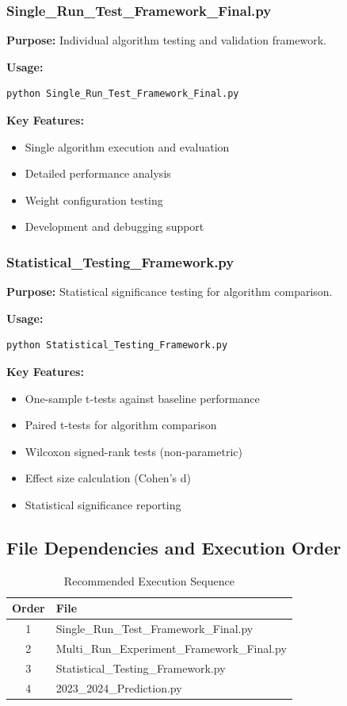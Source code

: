 \subsubsection{Single\_Run\_Test\_Framework\_Final.py}
\textbf{Purpose:} Individual algorithm testing and validation framework.

\textbf{Usage:}
\begin{verbatim}
python Single_Run_Test_Framework_Final.py
\end{verbatim}

\textbf{Key Features:}
\begin{itemize}
\item Single algorithm execution and evaluation
\item Detailed performance analysis
\item Weight configuration testing
\item Development and debugging support
\end{itemize}

\subsubsection{Statistical\_Testing\_Framework.py}
\textbf{Purpose:} Statistical significance testing for algorithm comparison.

\textbf{Usage:}
\begin{verbatim}
python Statistical_Testing_Framework.py
\end{verbatim}

\textbf{Key Features:}
\begin{itemize}
\item One-sample t-tests against baseline performance
\item Paired t-tests for algorithm comparison
\item Wilcoxon signed-rank tests (non-parametric)
\item Effect size calculation (Cohen's d)
\item Statistical significance reporting
\end{itemize}

\subsection{File Dependencies and Execution Order}

\begin{table}[h]
\centering
\caption{Recommended Execution Sequence}
\label{tab:execution_sequence}
\begin{tabular}{cl}
\toprule
\textbf{Order} & \textbf{File} \\
\midrule
1 & Single\_Run\_Test\_Framework\_Final.py \\
2 & Multi\_Run\_Experiment\_Framework\_Final.py \\
3 & Statistical\_Testing\_Framework.py \\
4 & 2023\_2024\_Prediction.py \\
\bottomrule
\end{tabular}
\end{table}


